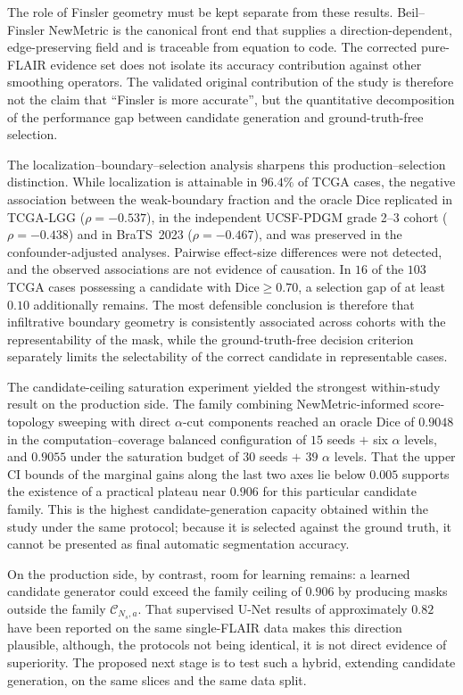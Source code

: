 \documentclass[11pt,a4paper]{article}
\begin{document}
The role of Finsler geometry must be kept separate from these results. Beil--Finsler
NewMetric is the canonical front end that supplies a direction-dependent,
edge-preserving field and is traceable from equation to code. The corrected
pure-FLAIR evidence set does not isolate its accuracy contribution against other
smoothing operators. The validated original contribution of the study is
therefore not the claim that ``Finsler is more accurate'', but the quantitative
decomposition of the performance gap between candidate generation and
ground-truth-free selection.

The localization--boundary--selection analysis sharpens this production--selection
distinction. While localization is attainable in $96.4\%$ of TCGA cases, the
negative association between the weak-boundary fraction and the oracle Dice
replicated in TCGA-LGG ($\rho=-0.537$), in the independent UCSF-PDGM grade 2--3
cohort ($\rho=-0.438$) and in BraTS~2023 ($\rho=-0.467$), and was preserved in the
confounder-adjusted analyses. Pairwise effect-size differences were not detected,
and the observed associations are not evidence of causation. In $16$ of the $103$
TCGA cases possessing a candidate with Dice$\ge0.70$, a selection gap of at least
$0.10$ additionally remains. The most defensible conclusion is therefore that
infiltrative boundary geometry is consistently associated across cohorts with the
representability of the mask, while the ground-truth-free decision criterion
separately limits the selectability of the correct candidate in representable
cases.

The candidate-ceiling saturation experiment yielded the strongest within-study
result on the production side. The family combining NewMetric-informed score-topology sweeping with direct
$\alpha$-cut components reached an oracle Dice of $0.9048$ in the
computation--coverage balanced configuration of $15$ seeds $+$ six $\alpha$ levels,
and $0.9055$ under the saturation budget of $30$ seeds $+$ $39$ $\alpha$ levels.
That the upper CI bounds of the marginal gains along the last two axes lie below
$0.005$ supports the existence of a practical plateau near $0.906$ for this
particular candidate family. This is the highest candidate-generation capacity
obtained within the study under the same protocol; because it is selected against
the ground truth, it cannot be presented as final automatic segmentation accuracy.

On the production side, by contrast, room for learning remains: a learned candidate
generator could exceed the family ceiling of $0.906$ by producing masks outside the
family $\mathcal C_{N_s,a}$. That supervised U-Net results of approximately $0.82$
have been reported on the same single-FLAIR data makes this direction plausible,
although, the protocols not being identical, it is not direct evidence of
superiority. The proposed next stage is to test such a hybrid, extending candidate
generation, on the same slices and the same data split.
\end{document}
